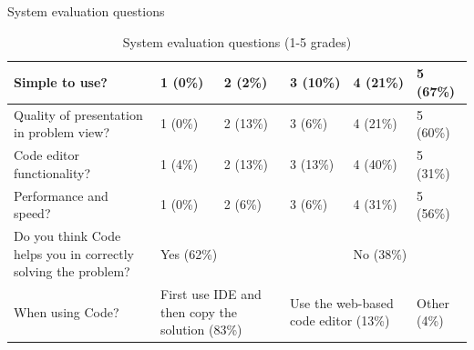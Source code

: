 \begin{frame}[shrink=20]{System evaluation questions}
\begin{table}
\caption{System evaluation questions (1-5 grades)}
\begin{center}
\begin{tabular}{ |p{5cm}|l|l|l|l|l| }
\hline
Simple to use? & 1 (0\%) & 2 (2\%) & 3 (10\%) & 4 (21\%) & 5 (67\%) \\
\hline
Quality of presentation in problem view? & 1 (0\%) & 2 (13\%) & 3 (6\%) & 4
(21\%) & 5 (60\%)
\\
\hline
Code editor functionality? & 1 (4\%) & 2 (13\%) & 3 (13\%) & 4 (40\%) & 5 (31\%)
\\
\hline
Performance and speed? & 1 (0\%) & 2 (6\%) & 3 (6\%) & 4 (31\%) & 5 (56\%) \\
\hline
Do you think Code helps you in correctly solving the problem? &
\multicolumn{3}{l|}{Yes (62\%)} & \multicolumn{2}{l|}{No (38\%)}
 \\
\hline
When using Code? & \multicolumn{2}{p{2.5cm}|}{First use IDE and then copy the
solution (83\%)} & \multicolumn{2}{p{2.5cm}|}{Use the web-based code editor
(13\%)} & Other (4\%) \\
\hline
\end{tabular}
\label{table:system_evaluation}
\end{center}
\end{table}
\end{frame}


